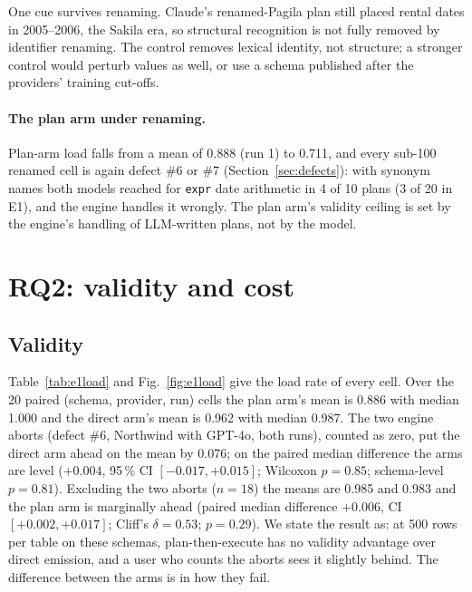 \documentclass[preprint,12pt]{elsarticle}
\begin{document}
One cue survives renaming. Claude's renamed-Pagila plan still placed rental dates in 2005--2006, the Sakila era, so structural recognition is not fully removed by identifier renaming. The control removes lexical identity, not structure; a stronger control would perturb values as well, or use a schema published after the providers' training cut-offs.

\paragraph{The plan arm under renaming.} Plan-arm load falls from a mean of 0.888 (run 1) to 0.711, and every sub-100 renamed cell is again defect \#6 or \#7 (Section~\ref{sec:defects}): with synonym names both models reached for \texttt{expr} date arithmetic in 4 of 10 plans (3 of 20 in E1), and the engine handles it wrongly. The plan arm's validity ceiling is set by the engine's handling of LLM-written plans, not by the model.

\section{RQ2: validity and cost}
\label{sec:rq2}

\subsection{Validity}
Table~\ref{tab:e1load} and Fig.~\ref{fig:e1load} give the load rate of every cell. Over the 20 paired (schema, provider, run) cells the plan arm's mean is 0.886 with median 1.000 and the direct arm's mean is 0.962 with median 0.987. The two engine aborts (defect \#6, Northwind with GPT-4o, both runs), counted as zero, put the direct arm ahead on the mean by 0.076; on the paired median difference the arms are level ($+0.004$, 95\,\% CI $[-0.017, +0.015]$; Wilcoxon $p=0.85$; schema-level $p=0.81$). Excluding the two aborts ($n=18$) the means are 0.985 and 0.983 and the plan arm is marginally ahead (paired median difference $+0.006$, CI $[+0.002, +0.017]$; Cliff's $\delta=0.53$; $p=0.29$). We state the result as: at 500 rows per table on these schemas, plan-then-execute has no validity advantage over direct emission, and a user who counts the aborts sees it slightly behind. The difference between the arms is in how they fail.
\end{document}
